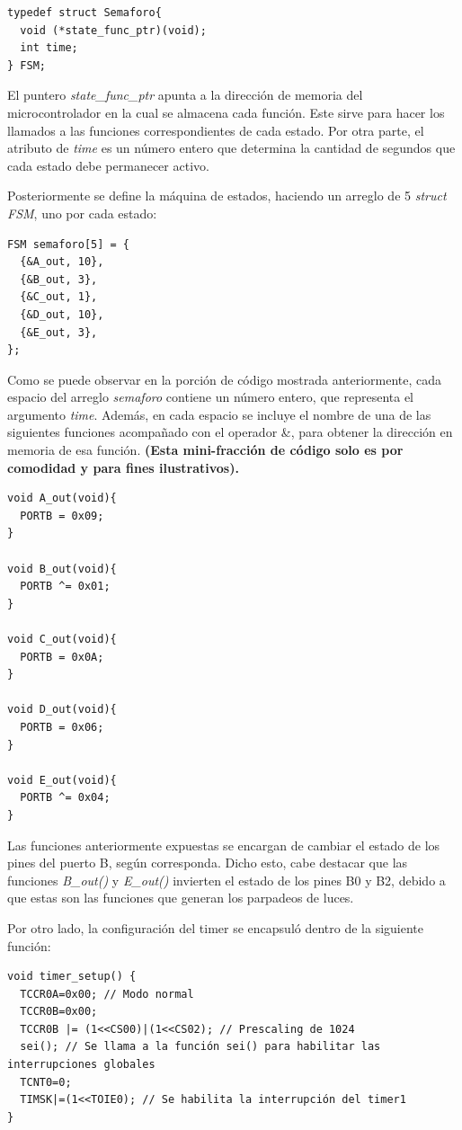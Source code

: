 \begin{verbatim}
typedef struct Semaforo{
  void (*state_func_ptr)(void);
  int time;
} FSM;
\end{verbatim}

El puntero \textit{state\_func\_ptr} apunta a la dirección de memoria del microcontrolador en la cual se almacena cada función. Este sirve para hacer los llamados a las funciones correspondientes de cada estado. Por otra parte, el atributo de \textit{time} es un número entero que determina la cantidad de segundos que cada estado debe permanecer activo.

Posteriormente se define la máquina de estados, haciendo un arreglo de 5 \textit{struct FSM}, uno por cada estado:

\begin{verbatim}
FSM semaforo[5] = {
  {&A_out, 10},
  {&B_out, 3},
  {&C_out, 1},
  {&D_out, 10},
  {&E_out, 3},
};
\end{verbatim}

Como se puede observar en la porción de código mostrada anteriormente, cada espacio del arreglo \textit{semaforo} contiene un número entero, que representa el argumento \textit{time}. Además, en cada espacio se incluye el nombre de una de las siguientes funciones acompañado con el operador \&, para obtener la dirección en memoria de esa función. \textbf{(Esta mini-fracción de código solo es por comodidad y para fines ilustrativos).}

\begin{verbatim}
void A_out(void){
  PORTB = 0x09;
}

void B_out(void){
  PORTB ^= 0x01;
}

void C_out(void){
  PORTB = 0x0A;
}

void D_out(void){
  PORTB = 0x06;
}

void E_out(void){
  PORTB ^= 0x04;
}
\end{verbatim}

Las funciones anteriormente expuestas se encargan de cambiar el estado de los pines del puerto B, según corresponda. Dicho esto, cabe destacar que las funciones \textit{B\_out()} y \textit{E\_out()} invierten el estado de los pines B0 y B2, debido a que estas son las funciones que generan los parpadeos de luces.

Por otro lado, la configuración del timer se encapsuló dentro de la siguiente función:

\begin{verbatim}
void timer_setup() {
  TCCR0A=0x00; // Modo normal
  TCCR0B=0x00; 
  TCCR0B |= (1<<CS00)|(1<<CS02); // Prescaling de 1024
  sei(); // Se llama a la función sei() para habilitar las interrupciones globales
  TCNT0=0;
  TIMSK|=(1<<TOIE0); // Se habilita la interrupción del timer1
}
\end{verbatim}

